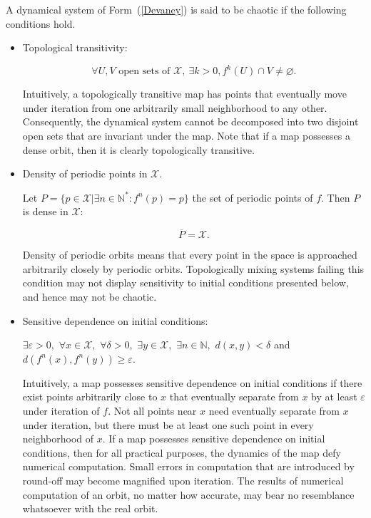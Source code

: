 \begin{definition}
 A dynamical system of Form~(\ref{Devaney}) is said to be chaotic if the following conditions hold.
\begin{itemize}
\item Topological transitivity:

\begin{equation}
\forall U,V \textrm{ open sets of } \mathcal{X},~\exists k>0, f^k(U) \cap V \neq \varnothing .
\end{equation}

Intuitively, a topologically transitive map has points that eventually move under iteration from one arbitrarily small neighborhood to any other. Consequently, the dynamical system cannot be decomposed into two disjoint open sets that are invariant under the map. Note that if a map possesses a dense orbit, then it is clearly topologically transitive.
\item Density of periodic points in $\mathcal{X}$.

Let $P=\{p\in \mathcal{X}|\exists n \in \mathds{N}^{\ast}:f^n(p)=p\}$ the set of periodic points of $f$. Then $P$ is dense in $\mathcal{X}$:

\begin{equation}
 \overline{P}=\mathcal{X} .
\end{equation}

Density of periodic orbits means that every point in the space is approached arbitrarily closely by periodic orbits. Topologically mixing systems failing this condition may not display sensitivity to initial conditions presented below, and hence may not be chaotic.
\item Sensitive dependence on initial conditions:

$\exists \varepsilon>0,$ $\forall x \in \mathcal{X},$ $\forall \delta >0,$ $\exists y \in \mathcal{X},$ $\exists n \in \mathbb{N},$ $d(x,y)<\delta$ and $d\left(f^n(x),f^n(y)\right) \geqslant \varepsilon.$

Intuitively, a map possesses sensitive dependence on initial conditions if there exist points arbitrarily close to $x$ that eventually separate from $x$ by at least $\varepsilon$ under iteration of $f$. Not all points near $x$ need eventually separate from $x$ under iteration, but there must be at least one such point in every neighborhood of $x$. If a map possesses sensitive dependence on initial conditions, then for all practical purposes, the dynamics of the map defy numerical computation. Small errors in computation that are introduced by round-off may become magnified upon iteration. The results of numerical computation of an orbit, no matter how accurate, may bear no resemblance whatsoever with the real orbit.
\end{itemize}

\end{definition}

